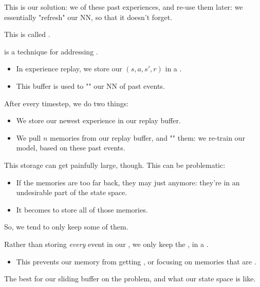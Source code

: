         This is our solution: we  of these past experiences, and re-use them later: we essentially "refresh" our NN, so that it doesn't forget.

        This is called .\\

        \begin{definition}
             is a technique for addressing .

            \begin{itemize}
                \item In experience replay, we store our  $(s,a,s',r)$ in a .

                \item This buffer is used to "" our NN of past events.
            \end{itemize}

            After every timestep, we do two things:

            \begin{itemize}
                \item We store our newest experience in our replay buffer.

                \item We  pull $n$ memories from our replay buffer, and "" them: we re-train our model, based on these past events.
            \end{itemize}
        \end{definition}

        This storage can get painfully large, though. This can be problematic:

        \begin{itemize}
            \item If the memories are too far back, they may just  anymore: they're in an undesirable part of the state space.
            \item It becomes  to store all of those memories.
        \end{itemize}

        So, we tend to only keep some of them.\\

        \begin{definition}
            Rather than storing \textit{every} event in our , we only keep the , in a .

            \begin{itemize}
                \item This prevents our memory from getting , or focusing on memories that are .
            \end{itemize}

           

            The best  for our sliding buffer  on the problem, and what our state space is like.
        \end{definition}


